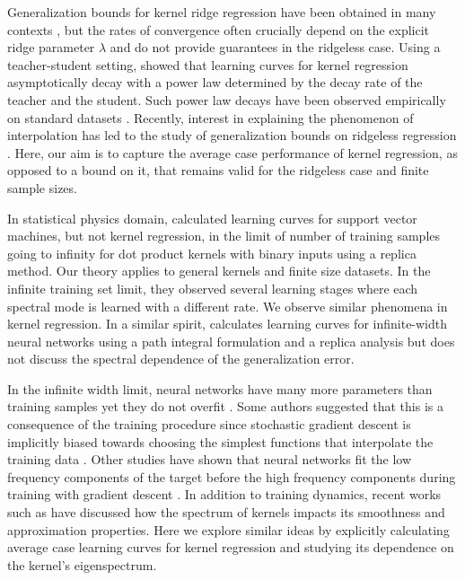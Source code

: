 \documentclass{article}
\begin{document}
Generalization bounds for kernel ridge regression have been obtained in many contexts \cite{scholkopf_smola, cucker, vapnik1999overview, gyorfi}, but the rates of convergence often crucially depend on the explicit ridge parameter $\lambda$ and do not provide guarantees in the ridgeless case. Using a teacher-student setting, \citet{spigler2019asymptotic} showed that learning curves for kernel regression asymptotically decay with a power law determined by the decay rate of the teacher and the student. Such power law decays have been observed empirically on standard datasets \cite{hestness2017deep,spigler2019asymptotic}. Recently, interest in explaining the phenomenon of interpolation has led to the study of generalization bounds on ridgeless regression \cite{belkin2018understand, belkin_mitra_overfitting_perfect, belkin_interpolation_optimality, liang2018just}. Here, our aim is to capture the average case performance of kernel regression, as opposed to a bound on it, that remains valid for the ridgeless case and finite sample sizes. 

In statistical physics domain, \citet{sompolinsky1999svm} calculated learning curves for support vector machines, but not kernel regression, in the limit of number of training samples going to infinity for dot product kernels with binary inputs using a replica method. Our theory applies to general kernels and finite size datasets. In the infinite training set limit, they observed several learning stages where each spectral mode is learned with a different rate. We observe similar phenomena in kernel regression. In a similar spirit, \cite{cohen2019learning} calculates learning curves for infinite-width neural networks using a path integral formulation and a replica analysis but does not discuss the spectral dependence of the generalization error.

In the infinite width limit, neural networks have many more parameters than training samples yet they do not overfit \cite{ZHANGDeep}. Some authors suggested that this is a consequence of the training procedure since stochastic gradient descent is implicitly biased towards choosing the simplest functions that interpolate the training data \cite{belkin2018reconciling,belkin2018understand, xu2019frequency, jacot2018neural}. Other studies have shown that neural networks fit the low frequency components of the target before the high frequency components during training with gradient descent \cite{xu2018training,rahaman2018spectral,zhang2019explicitizing,luo2019theory}. %
In addition to training dynamics, recent works such as \cite{yang2019finegrained, bietti2019inductive, cao2019understanding} have discussed how the spectrum of kernels impacts its smoothness and approximation properties. Here we explore similar ideas by explicitly calculating average case learning curves for kernel regression and studying its dependence on the kernel's eigenspectrum.
\end{document}
